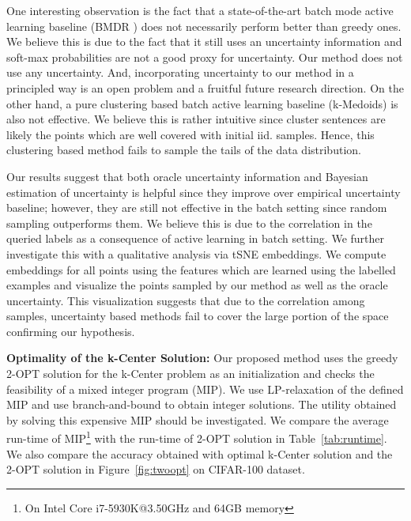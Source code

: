 \documentclass{article} %
\begin{document}
One interesting observation is the fact that a state-of-the-art batch mode active learning baseline (BMDR \citep{kdd13}) does not necessarily perform better than greedy ones. We believe this is due to the fact that it still uses an uncertainty information and soft-max probabilities are not a good proxy for uncertainty. Our method does not use any uncertainty. And, incorporating uncertainty to our method in a principled way is an open problem and a fruitful future research direction. On the other hand, a pure clustering based batch active learning baseline (k-Medoids) is also not effective. We believe this is rather intuitive since cluster sentences are likely the points which are well covered with initial iid. samples. Hence, this clustering based method fails to sample the tails of the data distribution.

Our results suggest that both oracle uncertainty information and Bayesian estimation of uncertainty is helpful since they improve over empirical uncertainty baseline; however, they are still not effective in the batch setting since random sampling outperforms them. We believe this is due to the correlation in the queried labels as a consequence of active learning in batch setting. We further investigate this with a qualitative analysis via
tSNE \citep{tsne} embeddings. We compute embeddings for all points using the features which are learned using the
labelled examples and visualize the points sampled by our method as well as the oracle uncertainty. This visualization
suggests that due to the correlation among samples, uncertainty based methods fail to cover the large portion of the
space confirming our hypothesis.



\noindent\textbf{Optimality of the k-Center Solution:} Our proposed method uses the greedy 2-OPT solution for the
k-Center problem as an initialization and checks the feasibility of a mixed integer program (MIP). We use
LP-relaxation of the defined MIP and use branch-and-bound to obtain integer solutions. The utility obtained by solving
this expensive MIP should be investigated. We compare the average run-time of MIP\footnote{On Intel Core
i7-5930K@3.50GHz and 64GB memory} with the run-time of 2-OPT solution in Table~\ref{tab:runtime}. We also compare the
accuracy obtained with optimal k-Center solution and the 2-OPT solution in Figure~\ref{fig:twoopt} on CIFAR-100 dataset.
\end{document}
